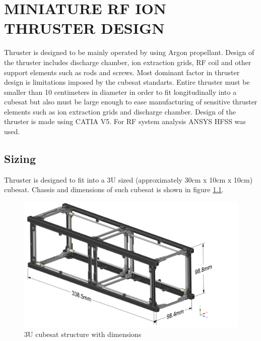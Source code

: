\chapter{MINIATURE RF ION THRUSTER DESIGN}\label{ch:Ch3}
Thruster is designed to be mainly operated by using Argon propellant. Design of the thruster includes discharge chamber, ion extraction grids, RF coil and other support elements such as rods and screws. Most dominant factor in thruster design is limitations imposed by the cubesat standarts. Entire thruster must be smaller than 10 centimeters in diameter in order to fit longitudinally into a cubesat but also must be large enough to ease manufacturing of sensitive thruster elements such as ion extraction grids and discharge chamber. Design of the thruster is made using CATIA V5. For RF system analysis ANSYS HFSS was used.

\section{Sizing}
Thruster is designed to fit into a 3U sized (approximately 30cm x 10cm x 10cm) cubesat. Chassis and dimensions of such cubesat is shown in figure \ref{fig:3Udims}.

\begin{figure}[ht]
    \centering
    \includegraphics[scale=0.5]{fig/3Udims.png}
    \caption{3U cubesat structure with dimensions}
    \label{fig:3Udims}
\end{figure}

